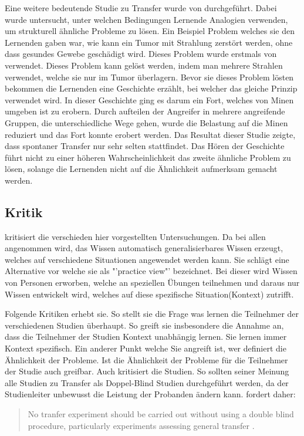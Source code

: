 Eine weitere bedeutende Studie zu Transfer wurde von \citet{Gick1980} durchgeführt. Dabei wurde untersucht, unter welchen Bedingungen Lernende Analogien verwenden, um strukturell ähnliche Probleme zu lösen. Ein Beispiel Problem welches sie den Lernenden gaben war, wie kann ein Tumor mit Strahlung zerstört werden, ohne dass gesundes Gewebe geschädigt wird. Dieses Problem wurde erstmals von \citet{Duncker1945} verwendet. Dieses Problem kann gelöst werden, indem man mehrere Strahlen verwendet, welche sie nur im Tumor überlagern. Bevor sie dieses Problem lösten bekommen die Lernenden eine Geschichte erzählt, bei welcher das gleiche Prinzip verwendet wird. In dieser Geschichte ging es darum ein Fort, welches von Minen umgeben ist zu erobern. Durch aufteilen der Angreifer in mehrere angreifende Gruppen, die unterschiedliche Wege gehen, wurde die Belastung auf die Minen reduziert und das Fort konnte erobert werden. Das Resultat dieser Studie zeigte, dass spontaner Transfer nur sehr selten stattfindet. Das Hören der Geschichte führt nicht zu einer höheren Wahrscheinlichkeit das zweite ähnliche Problem zu lösen, solange die Lernenden nicht auf die Ähnlichkeit aufmerksam gemacht werden.

\subsection{Kritik}

\citet{Lave1988} kritisiert die verschieden hier vorgestellten Untersuchungen. Da bei allen angenommen wird, das  Wissen automatisch generalisierbares Wissen erzeugt, welches auf verschiedene Situationen angewendet werden kann. Sie schlägt eine Alternative vor welche sie als "'practice view"' bezeichnet. Bei dieser wird Wissen von Personen erworben, welche an speziellen Übungen teilnehmen und daraus nur Wissen entwickelt wird, welches auf diese spezifische Situation(Kontext) zutrifft.

Folgende Kritiken erhebt sie. So stellt sie die Frage was lernen die Teilnehmer der verschiedenen Studien überhaupt. So greift sie insbesondere die Annahme an, dass die Teilnehmer der Studien Kontext unabhängig lernen. Sie lernen immer Kontext spezifisch. Ein anderer Punkt welche Sie angreift ist, wer definiert die Ähnlichkeit der Probleme. Ist die Ähnlichkeit der Probleme für die Teilnehmer der Studie auch greifbar. Auch \citet{Detterman1993} kritisiert die Studien. So sollten seiner Meinung alle Studien zu Transfer als Doppel-Blind Studien durchgeführt werden, da der Studienleiter unbewusst die Leistung der Probanden ändern kann. \citeauthor{Detterman1993} fordert daher:
\begin{quote}
No tranfer experiment should be carried out without using a double blind procedure, particularly experiments assessing general transfer \citet[S. 10]{Detterman1993}.
\end{quote}





